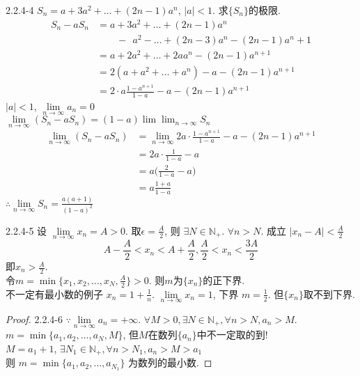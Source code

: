 2.2.4-4
$ S_n = a+3a^2+\dots+(2n-1)a^n $, $ |a|<1 $. 求$ \{S_n\} $的极限.
\begin{align*}
	S_n-aS_n
	&=a+3a^2+\dots+(2n-1)a^n\\
	&\qquad-\;\,a^2-\dots+(2n-3)a^n-(2n-1)a^n+1\\
	&=a+2a^2+\dots+2aa^n-(2n-1)a^{n+1}\\
	&=2(a+a^2+\dots+a^n)-a-(2n-1)a^{n+1}\\
	&=2\cdot{a}\frac{1-a^{n+1}}{1-a}-a-(2n-1)a^{n+1}
\end{align*}
$ |a|<1 $, $ \lim\limits_{n\rightarrow\infty}a_n=0 $\\
$ \lim\limits_{n\rightarrow\infty}(S_n-aS_n) = (1-a)\lim\lim_{n\rightarrow\infty}S_n $
\begin{align*}
	\lim_{n\rightarrow\infty}(S_n-aS_n)
	&=\lim_{n\rightarrow\infty}
	2a\cdot\frac{1-a^{n+1}}{1-a}-a-(2n-1)a^{n+1}\\
	&=2a\cdot\frac{1}{1-a}-a\\
	&=a\Big(\frac{2}{1-a}-a\Big)\\
	&=a\frac{1+a}{1-a}
\end{align*}
$ \therefore \lim\limits_{n\rightarrow\infty} S_n = \frac{a(a+1)}{(1-a)^2} $

2.2.4-5
设 $ \lim\limits_{n\rightarrow\infty} x_n = A>0 $. 取$ \epsilon = \frac{A}{2} $, 则 $ \exists N\in\mathbb{N}_+ $. $ \forall n>N $. 成立 $ |x_n-A|<\frac{A}{2} $ 
\begin{equation*}
	A-\frac{A}{2}<x_n<A+\frac{A}{2}, \frac{A}{2}<x_n<\frac{3A}{2}
\end{equation*}
即$ x_n>\frac{A}{2} $.\\
令$ m = \min\{x_1,x_2,\dots,x_N,\frac{A}{2}\} >0 $. 则$ m $为$ \{x_n\} $的正下界.\\
不一定有最小数的例子 $ x_n = 1+\frac{1}{n} $. $ \lim\limits_{n\rightarrow\infty}x_n = 1 $, 下界 $ m=  \frac{1}{2} $. 但$ \{x_n\} $取不到下界.

\begin{proof}
	2.2.4-6
	$ \because\lim\limits_{n\rightarrow\infty} a_n = +\infty $. $ \forall M>0, \exists N\in\mathbb{N}_+, \forall n>N, a_n>M $.\\
	$ m = \min\{a_1,a_2,\dots,a_N,M\} $, 但$ M $在数列$ \{a_n\} $中不一定取的到!\\
	$ M=a_1+1 $, $ \exists N_1\in\mathbb{N}_+, \forall n>N_1, a_n>M>a_1 $\\
	则 $ m = \min\{a_1,a_2,\dots,a_{N_1}\} $ 为数列的最小数.	
\end{proof}

